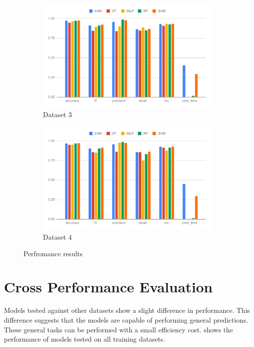 \begin{figure}[H]
\begin{subfigure}{.5\columnwidth}
    \includegraphics[width=0.9\columnwidth]{media/data/performance/perf_ds_3.pdf}
    \caption{Dataset 3}
    \label{fig:perfromance_results_dataset_3}
  \end{subfigure}%
  \begin{subfigure}{.5\columnwidth}
    \centering
    \includegraphics[width=0.9\columnwidth]{media/data/performance/perf_ds_4.pdf}
    \caption{Dataset 4}
    \label{fig:perfromance_results_dataset_4}
  \end{subfigure}
  \caption{Perfromance results}
  \label{fig:perfromance_results}
\end{figure}

\section{Cross Performance Evaluation} \label{sec:cross_performance_evaluation}

Models tested against other datasets show a slight difference in performance. This difference suggests that the models are capable of performing general predictions. These general tasks can be performed with a small efficiency cost.  shows the performance of models tested on all training datasets.

